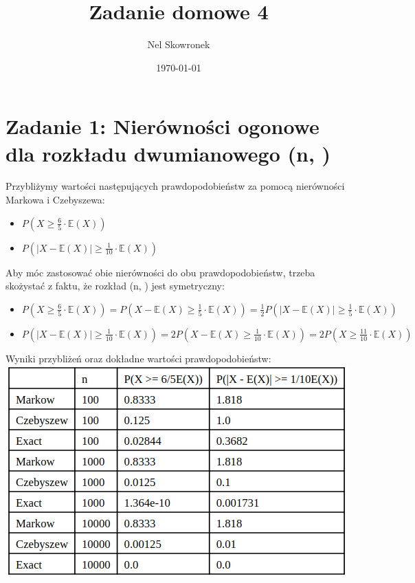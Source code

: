 \documentclass{article}
\title{Zadanie domowe 4}
\author{Nel Skowronek}
\date{\today}
\begin{document}
\maketitle

\section*{Zadanie 1: Nierówności ogonowe dla rozkładu dwumianowego \left(n, \right)}

Przybliżymy wartości następujących prawdopodobieństw za pomocą nierówności Markowa i Czebyszewa:
\begin{itemize}
    \item \( P\left(X \geq \frac{6}{5} \cdot \mathbb{E}(X)\right) \)
    \item \( P\left(\left|X - \mathbb{E}(X)\right| \geq \frac{1}{10} \cdot \mathbb{E}(X) \right) \)
\end{itemize}
Aby móc zastosować obie nierówności do obu prawdopodobieństw, trzeba skożystać z faktu, że rozkład \left(n, \right) jest symetryczny:
\begin{itemize}
    \item \( P\left(X \geq \frac{6}{5} \cdot \mathbb{E}(X)\right) = P\left(X - \mathbb{E}(X) \geq \frac{1}{5} \cdot \mathbb{E}(X)\right) = \frac{1}{2}P\left(\left|X - \mathbb{E}(X)\right| \geq \frac{1}{5} \cdot \mathbb{E}(X)\right) \)
    \item \( P\left(\left|X - \mathbb{E}(X) \right| \geq \frac{1}{10} \cdot \mathbb{E}(X) \right) = 2P\left(X - \mathbb{E}(X) \geq \frac{1}{10} \cdot \mathbb{E}(X) \right) = 2P\left(X \geq \frac{11}{10} \cdot \mathbb{E}(X) \right) \)
\end{itemize}

Wyniki przybliżeń oraz dokładne wartości prawdopodobieństw:\\
\hspace*{-0cm} \includegraphics[scale=0.5]{./plots/exc1.png}
\end{document}
